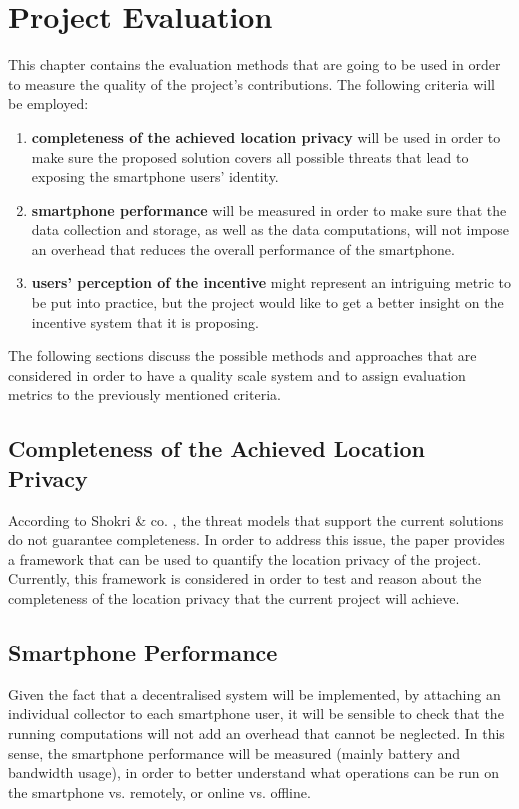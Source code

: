 \chapter{Project Evaluation}

This chapter contains the evaluation methods that are going to be used in order to measure the quality of the project's contributions. The following criteria will be employed:
\begin{enumerate}
\item \textbf{completeness of the achieved location privacy} will be used in order to make sure the proposed solution covers all possible threats that lead to exposing the smartphone users' identity.

\item \textbf{smartphone performance} will be measured in order to make sure that the data collection and storage, as well as the data computations, will not impose an overhead that reduces the overall performance of the smartphone.

\item \textbf{users' perception of the incentive} might represent an intriguing metric to be put into practice, but the project would like to get a better insight on the incentive system that it is proposing.
\end{enumerate}

The following sections discuss the possible methods and approaches that are considered in order to have a quality scale system and to assign evaluation metrics to the previously mentioned criteria.

\section{Completeness of the Achieved Location Privacy}
According to Shokri \& co. \cite{quantifylocationprivacy}, the threat models that support the current solutions do not guarantee completeness. In order to address this issue, the paper provides a framework that can be used to quantify the location privacy of the project. Currently, this framework is considered in order to test and reason about the completeness of the location privacy that the current project will achieve.

\section{Smartphone Performance}
Given the fact that a decentralised system will be implemented, by attaching an individual collector to each smartphone user, it will be sensible to check that the running computations will not add an overhead that cannot be neglected. In this sense, the smartphone performance will be measured (mainly battery and bandwidth usage), in order to better understand what operations can be run on the smartphone vs. remotely, or online vs. offline.

